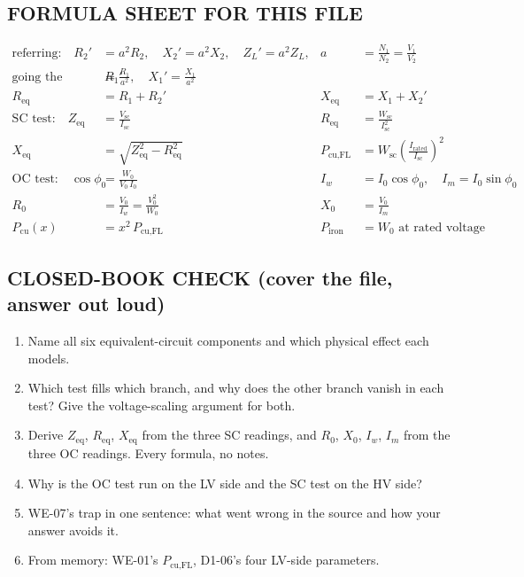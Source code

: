\documentclass[11pt]{article}
\begin{document}
\subsection*{\color{copper}FORMULA SHEET FOR THIS FILE}
\begin{align*}
\text{referring:}\quad R_2' &= a^{2} R_2, \quad X_2' = a^{2} X_2, \quad Z_L' = a^{2} Z_L,
& a &= \frac{N_1}{N_2} = \frac{V_1}{V_2} \\[4pt]
\text{going the other way:}\quad R_1' &= \frac{R_1}{a^{2}}, \quad X_1' = \frac{X_1}{a^{2}} \\[4pt]
R_{\text{eq}} &= R_1 + R_2'
& X_{\text{eq}} &= X_1 + X_2' \\[4pt]
\text{SC test:}\quad Z_{\text{eq}} &= \frac{V_{\text{sc}}}{I_{\text{sc}}}
& R_{\text{eq}} &= \frac{W_{\text{sc}}}{I_{\text{sc}}^{2}} \\[4pt]
X_{\text{eq}} &= \sqrt{Z_{\text{eq}}^{2} - R_{\text{eq}}^{2}}
& P_{\text{cu,FL}} &= W_{\text{sc}}\left(\frac{I_{\text{rated}}}{I_{\text{sc}}}\right)^{2} \\[4pt]
\text{OC test:}\quad \cos\phi_0 &= \frac{W_0}{V_0\, I_0}
& I_w &= I_0\cos\phi_0, \quad I_m = I_0\sin\phi_0 \\[4pt]
R_0 &= \frac{V_0}{I_w} = \frac{V_0^{2}}{W_0}
& X_0 &= \frac{V_0}{I_m} \\[4pt]
P_{\text{cu}}(x) &= x^{2}\, P_{\text{cu,FL}}
& P_{\text{iron}} &= W_0 \text{ at rated voltage}
\end{align*}

\subsection*{\color{copper}CLOSED-BOOK CHECK (cover the file, answer out loud)}
\begin{enumerate}[label=\arabic*.]
\item Name all six equivalent-circuit components and which physical effect each models.
\item Which test fills which branch, and why does the other branch vanish in each test? Give the voltage-scaling argument for both.
\item Derive $Z_{\text{eq}}$, $R_{\text{eq}}$, $X_{\text{eq}}$ from the three SC readings, and $R_0$, $X_0$, $I_w$, $I_m$ from the three OC readings. Every formula, no notes.
\item Why is the OC test run on the LV side and the SC test on the HV side?
\item WE-07's trap in one sentence: what went wrong in the source and how your answer avoids it.
\item From memory: WE-01's $P_{\text{cu,FL}}$, D1-06's four LV-side parameters.
\end{enumerate}
\end{document}
